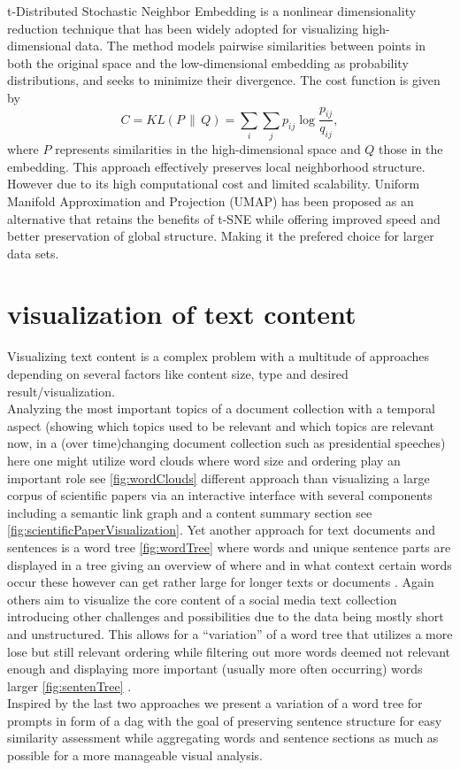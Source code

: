 \documentclass[
  a4paper,  %
  twoside,  %
  bibliography=totoc,
  headsepline,
  cleardoublepage=empty,
  parskip=half,
  draft=false
]{scrbook}
\begin{document}
t-Distributed Stochastic Neighbor Embedding \cite{van2008visualizing} is a
nonlinear dimensionality reduction technique that has been widely adopted for
visualizing high-dimensional data. The method models pairwise similarities between
points in both the original space and the low-dimensional embedding as probability
distributions, and seeks to minimize their divergence. The cost function is given by
\begin{equation}
	C = KL(P \,\|\, Q) = \sum_i \sum_j p_{ij} \log \frac{p_{ij}}{q_{ij}},
\end{equation}
where $P$ represents similarities in the high-dimensional space and $Q$ those in
the embedding. This approach effectively preserves local neighborhood structure.
However due to its high 
computational cost and limited scalability.
Uniform Manifold Approximation and Projection (UMAP) has been proposed as an
alternative that retains the benefits of t-SNE while offering improved speed and
better preservation of global structure. Making it the prefered choice for larger data sets.


\section{visualization of text content}
Visualizing text content is a complex problem with a multitude of approaches depending on several factors like content size, type and desired result/visualization.\\
Analyzing the most important topics of a document collection with a temporal aspect (showing which topics used to be relevant and which topics are relevant now, in a (over time)changing document collection such as presidential speeches) here one might utilize word clouds where word size and ordering play an important role see \cref{fig:wordClouds}  \cite{wordclouds}  different approach than visualizing a large corpus of scientific papers via an interactive interface with several components including a semantic link graph and a content summary section see \cref{fig:scientificPaperVisualization}\cite{visualizingPaperCollections}. Yet another approach for text documents and sentences is a word tree \cref{fig:wordTree} where words and unique sentence parts are displayed in a tree giving an overview of where and in what context certain words occur these however can get rather large for longer texts or documents \cite{wordTree}. Again others aim to visualize the core content of a social media text collection introducing other challenges and possibilities due to the data being mostly short and unstructured. This allows for a \enquote{variation} of a word tree that utilizes a more lose but still relevant ordering while filtering out more words deemed not relevant enough and displaying more important (usually more often occurring) words larger \cref{fig:sentenTree} \cite{sentenTree}.\\ 
Inspired by the last two approaches we present a variation of a word tree for prompts in form of a dag with the goal of preserving sentence structure for easy similarity assessment while aggregating words and sentence sections as much as possible for a more manageable visual analysis.
\end{document}
